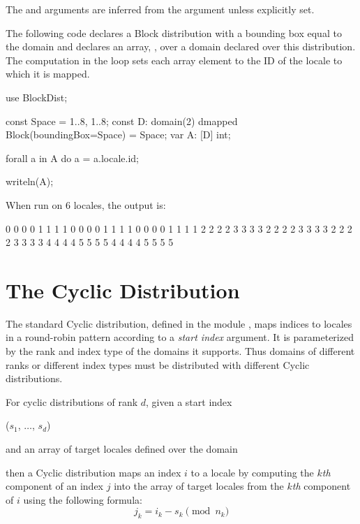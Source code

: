 The  and  arguments are inferred from the
 argument unless explicitly set.

\begin{example}
The following code declares a Block distribution with a bounding box
equal to the domain  and declares an array, , over
a domain declared over this distribution.  The computation in
the  loop sets each array element to the ID of the locale
to which it is mapped.
\begin{chapel}
use BlockDist;

const Space = {1..8, 1..8};
const D: domain(2) dmapped Block(boundingBox=Space) = Space;
var A: [D] int;

forall a in A do
  a = a.locale.id;

writeln(A);
\end{chapel}
When run on 6 locales, the output is:
\begin{chapelprintoutput}{}
0 0 0 0 1 1 1 1
0 0 0 0 1 1 1 1
0 0 0 0 1 1 1 1
2 2 2 2 3 3 3 3
2 2 2 2 3 3 3 3
2 2 2 2 3 3 3 3
4 4 4 4 5 5 5 5
4 4 4 4 5 5 5 5
\end{chapelprintoutput}
\end{example}


\section{The Cyclic Distribution}
\label{Cyclic_Dist}
The standard Cyclic distribution, defined in the
module , maps indices to locales in a round-robin
pattern according to a \emph{start index} argument.  It is
parameterized by the rank and index type of the domains it supports.
Thus domains of different ranks or different index types must be
distributed with different Cyclic distributions.

For cyclic distributions of rank $d$, given a start index
\begin{chapel}
($s_1$, $\ldots$, $s_d$)
\end{chapel}
and an array of target locales defined over the domain
\begin{chapel}
[$0$..$n_1$-1, $\ldots$, $0$..$n_d$-1]
\end{chapel}
then a Cyclic distribution maps an index $i$ to a locale by computing
the $k$\emph{th} component of an index $j$ into the array of target
locales from the $k$\emph{th} component of $i$ using the following
formula:
\[j_k = i_k - s_k \pmod{n_k}\]

